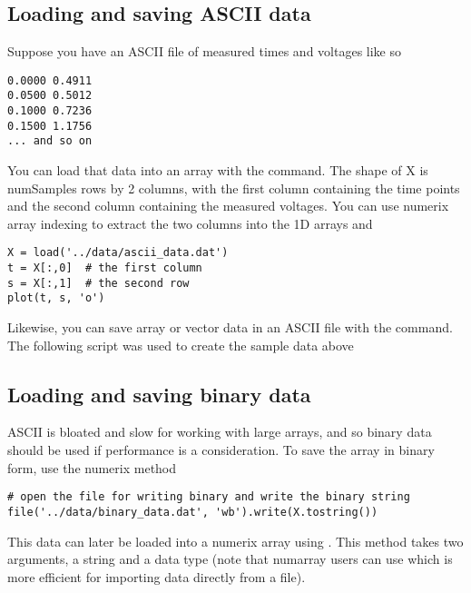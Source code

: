 \documentclass[]{book}
\begin{document}
\subsection{Loading and saving ASCII data}
\label{sec:ascii_data}
Suppose you have an ASCII file of measured times and voltages like so

\begin{verbatim}
0.0000 0.4911
0.0500 0.5012
0.1000 0.7236
0.1500 1.1756
... and so on
\end{verbatim}

\noindent You can load that data into an array  with the 
command.  The shape of X is numSamples rows by 2 columns, with the
first column containing the time points and the second column
containing the measured voltages.  You can use numerix array indexing
to extract the two columns into the 1D arrays  and 

\begin{lstlisting}
X = load('../data/ascii_data.dat')
t = X[:,0]  # the first column
s = X[:,1]  # the second row
plot(t, s, 'o')
\end{lstlisting}

Likewise, you can save array or vector data in an ASCII file
with the  command.  The following script was used to create
the sample data above



\subsection{Loading and saving binary data}
\label{sec:binary_data}

ASCII is bloated and slow for working with large arrays, and so binary
data should be used if performance is a consideration.  To save the
array  in binary form, use the numerix  method

\begin{lstlisting}
# open the file for writing binary and write the binary string
file('../data/binary_data.dat', 'wb').write(X.tostring())
\end{lstlisting}

\noindent This data can later be loaded into a numerix array using
.  This method takes two arguments, a string and a
data type (note that numarray users can use  which is
more efficient for importing data directly from a file).  


\end{document}
